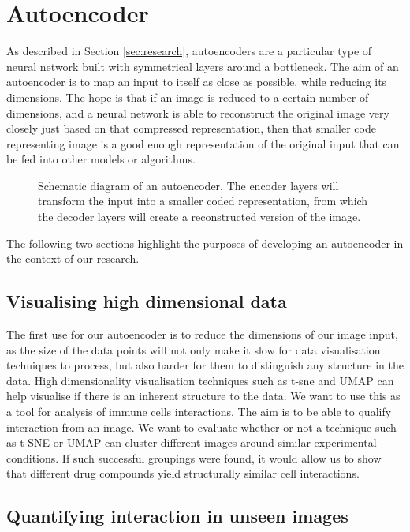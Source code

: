 \section{Autoencoder}

As described in Section \ref{sec:research}, autoencoders are a particular type of neural network built with symmetrical layers around a bottleneck. The aim of an autoencoder is to map an input to itself as close as possible, while reducing its dimensions. The hope is that if an image is reduced to a certain number of dimensions, and a neural network is able to reconstruct the original image very closely just based on that compressed representation, then that smaller code representing image is a good enough representation of the original input that can be fed into other models or algorithms.

\begin{figure}[h]
    \centering
    \caption{Schematic diagram of an autoencoder. The encoder layers will transform the input into a smaller coded representation, from which the decoder layers will create a reconstructed version of the image.}
    \label{fig:autoencoder}
\end{figure}

The following two sections highlight the purposes of developing an autoencoder in the context of our research.

\subsection{Visualising high dimensional data}

The first use for our autoencoder is to reduce the dimensions of our image input, as the size of the data points will not only make it slow for data visualisation techniques to process, but also harder for them to distinguish any structure in the data. High dimensionality visualisation techniques such as t-sne and UMAP can help visualise if there is an inherent structure to the data. We want to use this as a tool for analysis of immune cells interactions. The aim is to be able to qualify interaction from an image. We want to evaluate whether or not a technique such as t-SNE or UMAP can cluster different images around similar experimental conditions. If such successful groupings were found, it would allow us to show that different drug compounds yield structurally similar cell interactions. 

\subsection{Quantifying interaction in unseen images}

